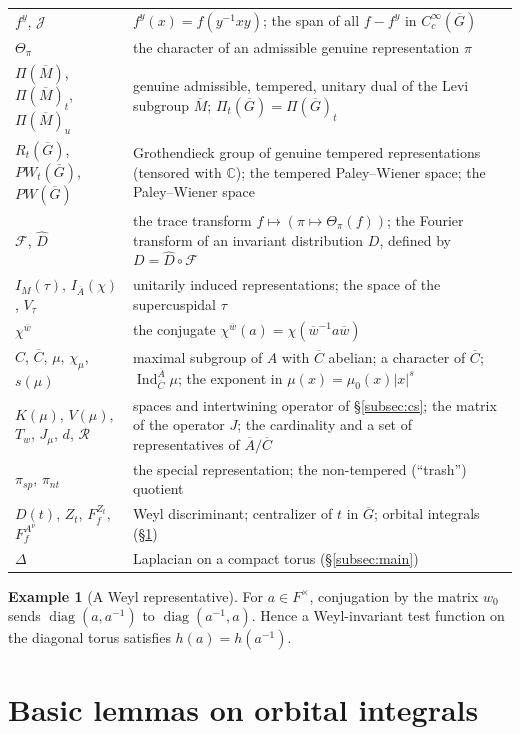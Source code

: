\documentclass[12pt,letterpaper]{article}
\theoremstyle{definition}
\newtheorem{example}[theorem]{Example}
\theoremstyle{remark}
\newcommand{\C}{\mathbb C}
\newcommand{\bG}{\overline{G}}
\newcommand{\bA}{\overline{A}}
\newcommand{\bC}{\overline{C}}
\newcommand{\bw}{\overline{w}}
\newcommand{\Pit}{\Pi_t(\bG)}
\newcommand{\Ind}{\operatorname{Ind}}
\newcommand{\sF}{\mathscr F}
\newcommand{\sJ}{\mathscr J}
\begin{document}
{\begin{longtable}{@{}>{\raggedright}p{4.1cm}>{\raggedright\arraybackslash}p{11.2cm}@{}}
$f^y$, $\sJ$ & $f^y(x)=f(y^{-1}xy)$; the span of all $f-f^y$ in $C_c^\infty(\bG)$ \\
$\Theta_\pi$ & the character of an admissible genuine representation $\pi$ \\
$\Pi(\overline M)$, $\Pi(\overline M)_t$, $\Pi(\overline M)_u$ & genuine admissible, tempered, unitary dual of the Levi subgroup $\overline M$; $\Pit=\Pi(\bG)_t$ \\
$R_t(\bG)$, $PW_t(\bG)$, $PW(\bG)$ & Grothendieck group of genuine tempered representations (tensored with $\C$); the tempered Paley--Wiener space; the Paley--Wiener space \\
$\sF$, $\widehat D$ & the trace transform $f\mapsto(\pi\mapsto\Theta_\pi(f))$; the Fourier transform of an invariant distribution $D$, defined by $D=\widehat D\circ\sF$ \\
$I_M(\tau)$, $I_{\bA}(\chi)$, $V_\tau$ & unitarily induced representations; the space of the supercuspidal $\tau$ \\
$\chi^{\bw}$ & the conjugate $\chi^{\bw}(a)=\chi(\bw^{-1}a\bw)$ \\
$C$, $\bC$, $\mu$, $\chi_\mu$, $s(\mu)$ & maximal subgroup of $A$ with $\bC$ abelian; a character of $\bC$; $\Ind_{\bC}^{\bA}\mu$; the exponent in $\mu(x)=\mu_0(x)|x|^s$ \\
$K(\mu)$, $V(\mu)$, $T_w$, $J_\mu$, $d$, $\mathcal R$ & spaces and intertwining operator of \S\ref{subsec:cs}; the matrix of the operator $J$; the cardinality and a set of representatives of $\bA/\bC$ \\
$\pi_{sp}$, $\pi_{nt}$ & the special representation; the non-tempered (``trash'') quotient \\
$D(t)$, $Z_t$, $F_f^{Z_t}$, $F_f^{A^\nu}$ & Weyl discriminant; centralizer of $t$ in $\bG$; orbital integrals (\S\ref{sec:orbital}) \\
$\Delta$ & Laplacian on a compact torus (\S\ref{subsec:main}) \\
\bottomrule
\end{longtable}}


\begin{example}[A Weyl representative]
For $a\in F^\times$, conjugation by the matrix $w_0$ sends
$\operatorname{diag}(a,a^{-1})$ to
$\operatorname{diag}(a^{-1},a)$.  Hence a Weyl-invariant test
function on the diagonal torus satisfies $h(a)=h(a^{-1})$.
\end{example}

\section{Basic lemmas on orbital integrals}\label{sec:orbital}
\end{document}
